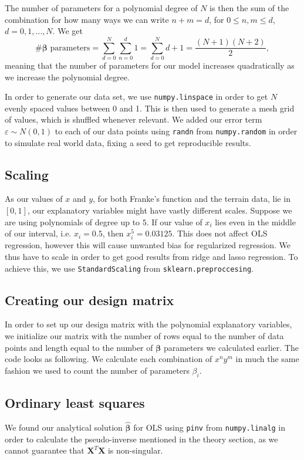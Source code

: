 \documentclass{article}
\begin{document}
The number of parameters for a polynomial degree of $N$ is then the sum of the combination for how many ways we can write $n+m = d$, for $0\leq n,m \leq d$, $d = 0, 1, \ldots, N$. We get
\begin{equation*}
    \text{\# $\boldsymbol{\beta}$ parameters} = \sum_{d = 0}^N \sum_{n = 0}^d 1
    = \sum_{d = 0}^N d + 1
    = \frac{(N + 1)(N + 2)}{2},
\end{equation*}
meaning that the number of parameters for our model increases quadratically as we increase the polynomial degree.

In order to generate our data set, we use \verb|numpy.linspace| in order to get $N$ evenly spaced values between 0 and 1. This is then used to generate a mesh grid of values, which is shuffled whenever relevant. We added our error term $\varepsilon \sim N(0,1)$ to each of our data points using \verb|randn| from \verb|numpy.random| in order to simulate real world data, fixing a seed to get reproducible results.

\subsection{Scaling}
As our values of $x$ and $y$, for both Franke's function and the terrain data,  lie in $[0, 1]$, our explanatory variables might have vastly different scales. Suppose we are using polynomials of degree up to $5$. If our value of $x_i$ lies even in the middle of our interval, i.e. $x_i = 0.5$, then $x_i^5 = 0.03125$. This does not affect OLS regression, however this will cause unwanted bias for regularized regression. We thus have to scale in order to get good results from ridge and lasso regression. To achieve this, we use \verb|StandardScaling| from \verb|sklearn.preproccesing|.

\subsection{Creating our design matrix}
In order to set up our design matrix with the polynomial explanatory variables, we initialize our matrix with the number of rows equal to the number of data points and length equal to the number of $\boldsymbol{\beta}$ parameters we calculated earlier. The code looks as following. We calculate each combination of $x^n y^m$ in much the same fashion we used to count the number of parameters $\beta_i$.

\subsection{Ordinary least squares}
We found our analytical solution $\boldsymbol{\hat{\beta}}$ for OLS using \verb|pinv| from \verb|numpy.linalg| in order to calculate the pseudo-inverse mentioned in the theory section, as we cannot guarantee that $\textbf{X}^T \textbf{X}$ is non-singular.
\end{document}
